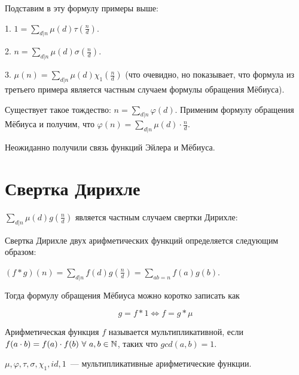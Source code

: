 \begin{example}
    Подставим в эту формулу примеры выше:

    1. $1 = \sum \limits_{d | n} \mu(d) \tau \left ( \frac{n}{d} \right )$.
    
    2. $n = \sum \limits_{d | n} \mu(d) \sigma \left ( \frac{n}{d} \right )$.

    3. $\mu(n) = \sum \limits_{d | n} \mu(d) \chi_1 \left ( \frac{n}{d} \right )$ (что очевидно, но показывает, что формула из третьего примера является частным случаем формулы обращения Мёбиуса).
\end{example}

\begin{example}
    Существует такое тождество: $n = \sum \limits_{d | n} \varphi(d)$. Применим формулу обращения Мёбиуса и получим, что
    $\varphi(n) = \sum \limits_{d | n} \mu(d) \cdot \frac{n}{d}$.

    Неожиданно получили связь функций Эйлера и Мёбиуса.
\end{example}

\section{Свертка Дирихле}

$\sum \limits_{d | n} \mu(d) g \left ( \frac{n}{d} \right )$ является частным случаем свертки Дирихле:

\begin{definition}
    Свертка Дирихле двух арифметических функций определяется следующим образом:

    $(f * g)(n) = \sum \limits_{d | n} f(d) g \left ( \frac{n}{d} \right ) = \sum \limits_{ab = n} f(a) g(b)$.
\end{definition}

\begin{observation}
    \label{Mobius: dirform}
    Тогда формулу обращения Мёбиуса можно коротко записать как

    $$
    g = f * 1 \Leftrightarrow f = g * \mu
    $$
\end{observation}

\begin{definition}
    Арифметическая функция $f$ называется мультипликативной, если
    $f(a \cdot b) = f(a) \cdot f(b) \ \forall \ a, b \in \mathbb{N}$, таких что $gcd(a, b) = 1$.
\end{definition}

\begin{observation}
    $\mu, \varphi, \tau, \sigma, \chi_1, id, 1$~--- мультипликативные арифметические функции.
\end{observation}

